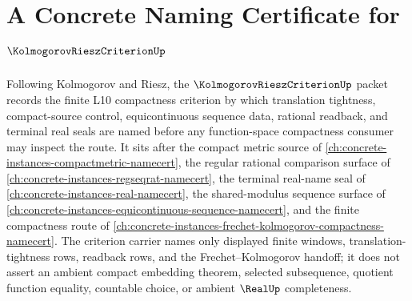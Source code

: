 \chapter{A Concrete Naming Certificate for $\KolmogorovRieszCriterionUp$}
\label{ch:concrete-instances-kolmogorov-riesz-criterion-namecert}

Following Kolmogorov and Riesz, the $\KolmogorovRieszCriterionUp$ packet records the finite L10 compactness criterion by which translation tightness, compact-source control, equicontinuous sequence data, rational readback, and terminal real seals are named before any function-space compactness consumer may inspect the route. It sits after the compact metric source of \autoref{ch:concrete-instances-compactmetric-namecert}, the regular rational comparison surface of \autoref{ch:concrete-instances-regseqrat-namecert}, the terminal real-name seal of \autoref{ch:concrete-instances-real-namecert}, the shared-modulus sequence surface of \autoref{ch:concrete-instances-equicontinuous-sequence-namecert}, and the finite compactness route of \autoref{ch:concrete-instances-frechet-kolmogorov-compactness-namecert}. The criterion carrier names only displayed finite windows, translation-tightness rows, readback rows, and the Frechet--Kolmogorov handoff; it does not assert an ambient compact embedding theorem, selected subsequence, quotient function equality, countable choice, or ambient $\RealUp$ completeness.

